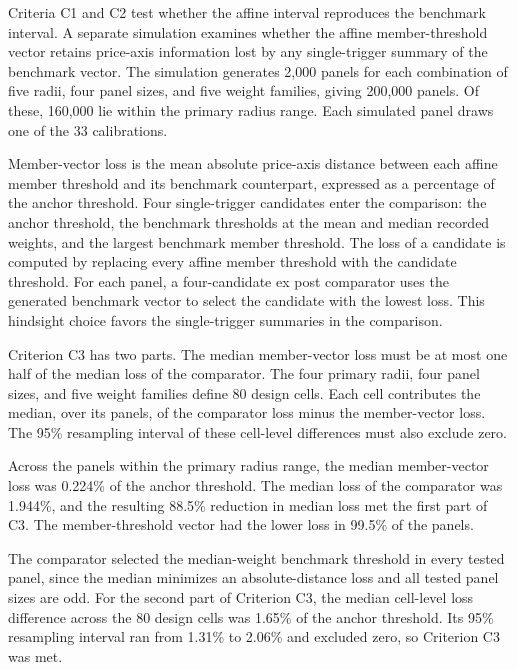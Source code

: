 Criteria C1 and C2 test whether the affine interval reproduces the benchmark interval. A separate simulation examines whether the affine member-threshold vector retains price-axis information lost by any single-trigger summary of the benchmark vector. The simulation generates 2,000 panels for each combination of five radii, four panel sizes, and five weight families, giving 200,000 panels. Of these, 160,000 lie within the primary radius range. Each simulated panel draws one of the 33 calibrations.

Member-vector loss is the mean absolute price-axis distance between each affine member threshold and its benchmark counterpart, expressed as a percentage of the anchor threshold. Four single-trigger candidates enter the comparison: the anchor threshold, the benchmark thresholds at the mean and median recorded weights, and the largest benchmark member threshold. The loss of a candidate is computed by replacing every affine member threshold with the candidate threshold. For each panel, a four-candidate ex post comparator uses the generated benchmark vector to select the candidate with the lowest loss. This hindsight choice favors the single-trigger summaries in the comparison.

Criterion C3 has two parts. The median member-vector loss must be at most one half of the median loss of the comparator. The four primary radii, four panel sizes, and five weight families define 80 design cells. Each cell contributes the median, over its panels, of the comparator loss minus the member-vector loss. The 95\% resampling interval of these cell-level differences must also exclude zero.

Across the panels within the primary radius range, the median member-vector loss was 0.224\% of the anchor threshold. The median loss of the comparator was 1.944\%, and the resulting 88.5\% reduction in median loss met the first part of C3. The member-threshold vector had the lower loss in 99.5\% of the panels.

The comparator selected the median-weight benchmark threshold in every tested panel, since the median minimizes an absolute-distance loss and all tested panel sizes are odd. For the second part of Criterion C3, the median cell-level loss difference across the 80 design cells was 1.65\% of the anchor threshold. Its 95\% resampling interval ran from 1.31\% to 2.06\% and excluded zero, so Criterion C3 was met.

